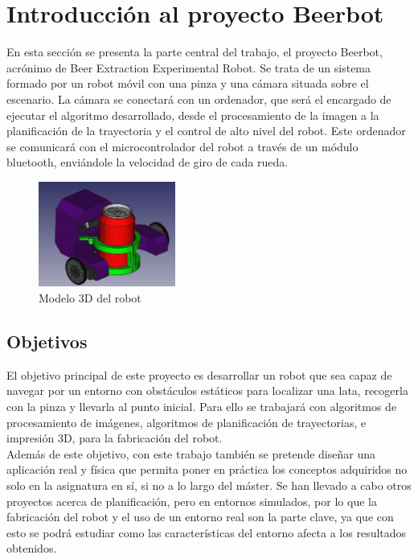 \section{Introducción al proyecto Beerbot}
\label{introduccion_desarrollo}

En esta sección se presenta la parte central del trabajo, el proyecto Beerbot, acrónimo de Beer Extraction Experimental Robot. Se trata de un sistema formado por un robot móvil con una pinza y una cámara situada sobre el escenario. La cámara se conectará con un ordenador, que será el encargado de ejecutar el algoritmo desarrollado, desde el procesamiento de la imagen a la planificación de la trayectoria y el control de alto nivel del robot. Este ordenador se comunicará con el microcontrolador del robot a través de un módulo bluetooth, enviándole la velocidad de giro de cada rueda.\\

\begin{figure}[H]
        \centering
        \includegraphics[width=0.4\textwidth]{images/robot.jpg}
        \caption{Modelo 3D del robot}
        \label{fig:robot}
\end{figure} 

\subsection{Objetivos}

El objetivo principal de este proyecto es desarrollar un robot que sea capaz de navegar por un entorno con obstáculos estáticos para localizar una lata, recogerla con la pinza y llevarla al punto inicial. Para ello se trabajará con algoritmos de procesamiento de imágenes, algoritmos de planificación de trayectorias, e impresión 3D, para la fabricación del robot.\\

Además de este objetivo, con este trabajo también se pretende diseñar una aplicación real y física que permita poner en práctica los conceptos adquiridos no solo en la asignatura en sí, si no a lo largo del máster. Se han llevado a cabo otros proyectos acerca de planificación, pero en entornos simulados, por lo que la fabricación del robot y el uso de un entorno real son la parte clave, ya que con esto se podrá estudiar como las características del entorno afecta a los resultados obtenidos.\\
 
